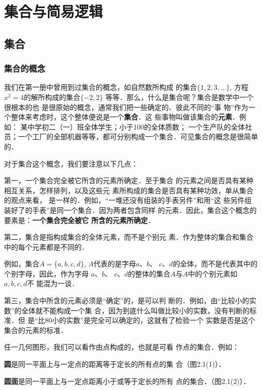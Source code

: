 \chapter{集合与简易逻辑}

\section{集合}
\subsection{集合的概念}
我们在第一册中曾用到过集合的概念，如自然数所构成
的集合$\{1,2,3,\ldots\}$, 方程$x^2=4$的解所构成的集合$\{-2,2\}$
等等．那么，什么是集合呢？集合是数学中一个很根本的也
是很原始的概念，通常我们把一些确定的、彼此不同的“事
物”作为一个整体来考虑时，这个整体便说是一个\textbf{集合}．这
些事物叫做该集合的\textbf{元素}．例如：
某中学初二（一）班全体学生；小于100的全体质数；
一个生产队的全体社员；一个工厂的全部机器等等，都可分别构成一个集合．可见集合的概念是很简单
的．

对于集合这个概念，我们要注意以下几点：

第一，一个集合完全被它所含的元素所确定．至于集合
的元素之间是否具有某种相互关系，怎样排列，以及这些元
素所构成的集合是否具有某种功效，单从集合的观点来看，
是一样的．例如，“一堆还没有组装的手表另件”和用“这
些另件组装好了的手表”是同一个集合．因为两者包含同样
的元素．因此，集合这个概念的要素是：\textbf{一个集合完全被它
	所含的元素所确定}．

第二，集合是指构成集合的全体元素，而不是个别元
素．作为整体的集合和集合中的每个元素都是不同的．

例如，集合$A=\{a,b,c,d\}$, $A$代表的是字母$a$、$b$、
$c$、$d$的全体，而不是代表其中的个别字母，因此，作为字母
$a$、$b$、
$c$、$d$的整体的集合$A$与$A$中的个别元素如$a,b,c,d$不
能混为一谈．

第三，集合中所含的元素必须是“确定”的，是可以判
断的．例如，由“比较小的实数”的全体就不能构成一个集
合，因为到底什么叫做比较小的实数，没有判断的标准．但
是“比80小的实数”是完全可以确定的，这就有了检验一个
实数是否是这个集合的元素的标准．

任一几何图形，我们可以看作由点构成的，也就是可看
作点的集合．例如：

\textbf{圆}是同一平面上与一定点的距离等于定长的所有点的集
合（图2.1(1)）．

\textbf{圆面}是同一平面上与一定点距离小于或等于定长的所有
点的集合．（图2.1(2)）．


